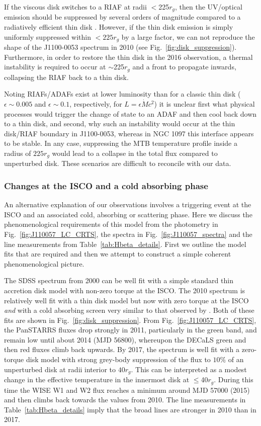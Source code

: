 \documentclass[a4paper,fleqn,usenatbib]{mnras}
\begin{document}
If the viscous disk switches to a RIAF at radii $<$225$r_{g}$, then the UV/optical emission should be suppressed by several orders of magnitude compared to a radiatively efficient thin disk \citep{Narayan1998, Abramowicz2002, Abramowicz2013}. However, if the thin disk emission is simply uniformly suppressed within $<225r_{g}$ by a large factor, we can not reproduce the shape of the J1100-0053 spectrum in 2010 (see Fig.~\ref{fig:disk_suppression}). Furthermore, in order to restore the thin disk in the 2016 observation, a thermal instability is required to occur at $\sim$225$r_{g}$ and a front to propagate inwards, collapsing the RIAF back to a thin disk.

Noting RIAFs/ADAFs exist at lower luminosity than for a classic thin
disk ($\epsilon \sim 0.005$ and $\epsilon \sim 0.1$, respectively, for
$L=\epsilon \dot{M} c^{2}$) it is unclear first what physical
processes would trigger the change of state to an ADAF and then cool
back down to a thin disk, and second, why such an instability would
occur at the thin disk/RIAF boundary in J1100-0053, whereas in NGC
1097 this interface appears to be stable. In any case, suppressing the
MTB temperature profile inside a radius of $225 r_{g}$ would lead to a
collapse in the total flux compared to unperturbed disk. These
scenarios are difficult to reconcile with our data.


\subsubsection{Changes at the ISCO and a cold absorbing phase}
An alternative explanation of our observations involves a triggering
event at the ISCO and an associated cold, absorbing or scattering
phase. Here we discuss the phenomenological requirements of this model
from the photometry in Fig.~\ref{fig:J110057_LC_CRTS}, the spectra in
Fig.~\ref{fig:J110057_spectra} and the line measurements from
Table~\ref{tab:Hbeta_details}. First we outline the model fits that are
required and then we attempt to construct a simple coherent
phenomenological picture.

The SDSS spectrum from 2000 can be well fit with a simple standard
thin accretion disk model with non-zero torque at the ISCO. The 2010
spectrum is relatively well fit with a thin disk model but now with
zero torque at the ISCO \emph{and} with a cold absorbing screen very
similar to that observed by \citet{Guo2016}. Both of these fits are
shown in Fig.~\ref{fig:disk_suppression}. From
Fig.~\ref{fig:J110057_LC_CRTS}, the PanSTARRS fluxes drop strongly in
2011, particularly in the green band, and remain low until about 2014
(MJD 56800), whereupon the DECaLS green and then red fluxes climb back
upwards. By 2017, the spectrum is well fit with a zero-torque disk
model with strong grey-body suppression of the flux to $10\%$ of an
unperturbed disk at radii interior to $40r_{g}$. This can be
interpreted as a modest change in the effective temperature in the
innermost disk at $\leq$40$r_{g}$. During this time the WISE W1 and W2
flux reaches a minimum around MJD 57000 (2015) and then climbs back
towards the values from 2010. The line measurements in
Table~\ref{tab:Hbeta_details} imply that the broad lines are stronger in
2010 than in 2017.
\end{document}
